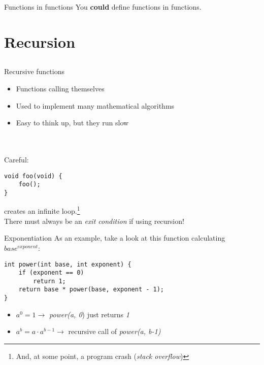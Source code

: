 \begin{frame}{Functions in functions}
	You \textbf{could} define functions in functions.\footnotemark
	
\end{frame}

\section{Recursion}
\subsection{}
\begin{frame}[fragile]{Recursive functions}
	\begin{itemize}
		\item Functions calling themselves
		\item Used to implement many mathematical algorithms
		\item Easy to think up, but they run slow
	\end{itemize} \ \\ \ \\
	Careful:
	\begin{lstlisting}
void foo(void) {
	foo();
}
\end{lstlisting}
	creates an infinite loop.\footnote{And, at some point, a program crash (\textit{stack overflow})} \\
	There must always be an \textit{exit condition} if using recursion!
\end{frame}

\begin{frame}[fragile]{Exponentiation}
As an example, take a look at this function calculating $base^{exponent}$:
	\begin{lstlisting}
int power(int base, int exponent) {
	if (exponent == 0)
		return 1;
	return base * power(base, exponent - 1);
}
\end{lstlisting}
	\begin{itemize}
		\item $a^{0} = 1 \rightarrow$ \textit{power(a, 0}) just returns \textit{1}
		\item $a^{b} = a \cdot a^{b-1} \rightarrow$ recursive call of \textit{power(a, b-1)}
	\end{itemize}
\end{frame}

